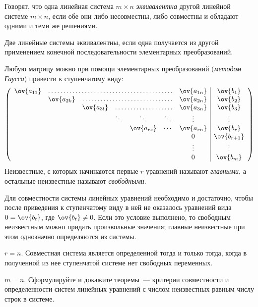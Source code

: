 Говорят, что одна линейная система $m \times n$ \emph{эквивалентна} другой
линейной системе $m \times n$, если обе они либо несовместны, либо совместны и
обладают одними и теми же решениями.

\begin{problems}

\item
Две линейные системы эквивалентны, если одна получается из другой применением
конечной последовательности элементарных преобразований.

\item
Любую матрицу можно при помощи элементарных преобразований
(\emph{методом Гаусса}) привести к ступенчатому виду:\pagebreak[0]
\[
\left(\begin{array}{ccccccc|c}
    \ov{a_{11}} & \hdotsfor{5} & \ov{a_{1n}} & \ov{b_1}
\\
    & \ov{a_{2k}} & \hdotsfor{4} & \ov{a_{2n}} & \ov{b_2}
\\
    & & \ov{a_{3l}} & \hdotsfor{3} & \ov{a_{3n}} & \ov{b_3}
\\
    & & & \ddots & \ddots & \ddots & \vdots & \vdots
\\
    & & & & \ov{a_{rs}} & \cdots & \ov{a_{rn}} & \ov{b_r}
\\
    & & & & & & 0 & \ov{b_{r+1}}
\\
    & & & & & & \vdots & \vdots
\\
    & & & & & & 0 & \ov{b_{m}}
\end{array}\right)
\]
Неизвестные, с которых начинаются первые $r$ уравнений называют
\emph{главными}, а остальные неизвестные называют \emph{свободными}.

\item
Для совместности системы линейных уравнений необходимо и достаточно, чтобы
после приведения к ступенчатому виду в ней не оказалось уравнений вида
$0 = \ov{b_t}$, где $\ov{b_t} \not= 0$.
Если это условие выполнено, то свободным неизвестным можно придать произвольные
значения;
главные неизвестные при этом однозначно определяются из системы.

\item
$r = n$.
Совместная система является определенной тогда и только тогда, когда в
полученной из нее ступенчатой системе нет свободных переменных.

\item
$m = n$.
Сформулируйте и докажите теоремы~--- критерии совместности и определенности
систем линейных уравнений с числом неизвестных равным числу строк в системе.


\end{problems}
